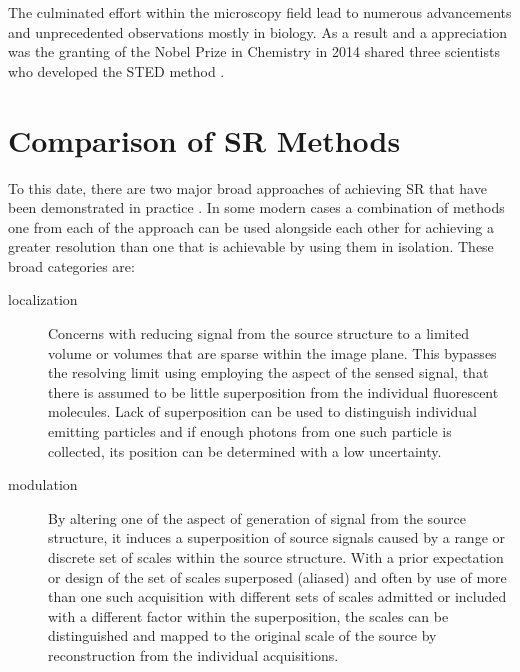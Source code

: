 The culminated effort within the microscopy field lead to numerous advancements and unprecedented observations mostly in
    biology.
As a result and a appreciation was the granting of the Nobel Prize in Chemistry in 2014 shared three scientists who
    developed the \ac{STED} method .

\section{Comparison of \ac{SR} Methods}

To this date, there are two major broad approaches of achieving \ac{SR} that have been demonstrated in practice 
    .
In some modern cases a combination of methods one from each of the approach can be used alongside each other for
    achieving a greater resolution than one that is achievable by using them in isolation.
These broad categories are:
    \begin{description}
        \item[localization]%
            Concerns with reducing signal from the source structure to a limited volume or volumes that are sparse 
                within the image plane. 
            This bypasses the resolving limit using employing the aspect of the sensed signal, that there is assumed to 
                be little superposition from the individual fluorescent molecules.
            Lack of superposition can be used to distinguish individual emitting particles and if enough photons from
                one such particle is collected, its position can be determined with a low uncertainty.
        \item[modulation]%
            By altering one of the aspect of generation of signal from the source structure, it induces a
                superposition of source signals caused by a range or discrete set of scales within the source structure.
            With a prior expectation or design of the set of scales superposed (aliased) and often by use of more than
                one such acquisition with different sets of scales admitted or included with a different factor within
                the superposition, the scales can be distinguished and mapped to the original scale of the source by
                reconstruction from the individual acquisitions.
    \end{description}

